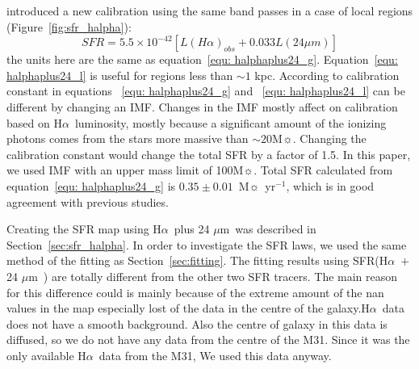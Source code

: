\documentclass[useAMS,usenatbib]{mn2e}
\newcommand \halpha    {H$\alpha $\ }
\newcommand \um    {$\mu$m\ }
\begin{document}
\cite{Calzetti07} introduced a new calibration using the same band passes in a case of local regions (Figure~\ref{fig:sfr_halpha}):
\begin{equation}
\label{equ: halphaplus24_l}
SFR = 5.5 \times 10^{-42}[L(H{\alpha})_{obs} + 0.033L(24\mu m)]
\end{equation}
the units here are the same as equation~\ref{equ: halphaplus24_g}. Equation~\ref{equ: halphaplus24_l} is useful for regions less than $\sim 1$ kpc. According to  \cite{Calzetti07} calibration constant in equations ~\ref{equ: halphaplus24_g} and ~\ref{equ: halphaplus24_l} can be different by changing an IMF. Changes in the IMF mostly affect on calibration based on \halpha luminosity, mostly because a significant amount of the ionizing photons comes from the stars more massive than $\sim 20$M$\sun$. Changing the calibration constant would change the total SFR by a factor of 1.5. In this paper, we used \cite{Kroupa01} IMF with an upper mass limit of 100M$\sun$. Total SFR calculated from equation~\ref{equ: halphaplus24_g} is $0.35 \pm 0.01$~M$\sun$~yr$^{-1}$, which is in good agreement with previous studies.

Creating the SFR map using \halpha plus 24 \um was described in Section~\ref{sec:sfr_halpha}. In order to investigate the SFR laws, we used the same method of the fitting as Section~\ref{sec:fitting}. The fitting results using SFR(\halpha $+$ 24 \um ) are totally different from the other two SFR tracers. The main reason for this difference could is mainly because of the extreme amount of the nan values in the map especially lost of the data in the centre of the galaxy.\halpha data does not have a smooth background. Also the centre of galaxy in this data is diffused, so we do not have any data from the centre of the M31. Since it was the only available \halpha data from the M31, We used this data anyway.
\end{document}
